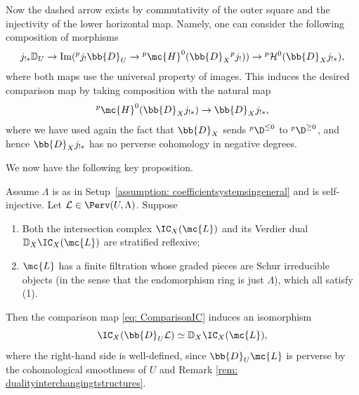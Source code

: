 \documentclass[letterpaper,11pt]{amsart}
\begin{document}
\begin{construction}
Now the dashed arrow exists by commutativity of the outer square and the injectivity of the lower horizontal map. Namely, one can consider the following composition of morphisms
\[j_{!\ast}\mathbb{D}_U \to \operatorname{Im}(\phantom{}^pj_!\bb{D}_U\to \phantom{}^p\mc{H}^0(\bb{D}_X\phantom{}^pj_!))\to \phantom{}^p\mathcal{H}^0(\bb{D}_Xj_{!\ast}),\]
where both maps use the universal property of images. This induces the desired comparison map by taking composition with the natural map 
\[\phantom{}^p\mc{H}^0(\bb{D}_Xj_{!\ast})\to \bb{D}_Xj_{!\ast},\]
where we have used again the fact that $\bb{D}_X$ sends $\phantom{}^p\D^{\leq 0}$ to $\phantom{}^p\D^{\geq 0}$, and hence $\bb{D}_Xj_{!\ast}$ has no perverse cohomology in negative degrees.
\end{construction}



We now have the following key proposition. 
\begin{proposition}\label{prop: VerdierDualIC}
Assume $\Lambda$ is as in Setup~\ref{assumption: coefficientsystemsingeneral} and is self-injective. Let $\mathcal{L} \in \Perv(U,\Lambda)$. Suppose  
\begin{enumerate}
    \item Both the intersection complex $\IC_X(\mc{L})$ and its Verdier dual $\mathbb{D}_{X}\IC_X(\mc{L})$ are stratified reflexive;
    \item $\mc{L}$ has a finite filtration whose graded pieces are Schur irreducible objects (in the sense that the endomorphism ring is just $\Lambda$), which all satisfy (1).
\end{enumerate}
Then the comparison map \eqref{eq: ComparisonIC} induces an isomorphism
\[\IC_{X}(\bb{D}_{U}\mathcal{L})\simeq \mathbb{D}_{X}\IC_X(\mc{L}),\] 
where the right-hand side is well-defined, since $\bb{D}_U\mc{L}$ is perverse by the cohomological smoothness of $U$ and Remark \ref{rem: dualityinterchangingtstructures}.
\end{proposition}
\end{document}
